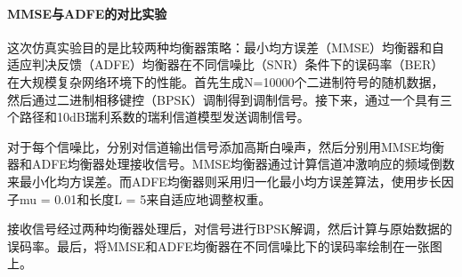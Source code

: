 \documentclass[UTF8,a4paper,12pt]{ctexart}
\numberwithin{equation}{section}
\begin{document}
\paragraph{MMSE与ADFE的对比实验}
这次仿真实验目的是比较两种均衡器策略：最小均方误差（MMSE）均衡器和自适应判决反馈（ADFE）均衡器在不同信噪比（SNR）条件下的误码率（BER）在大规模复杂网络环境下的性能。首先生成N=10000个二进制符号的随机数据，然后通过二进制相移键控（BPSK）调制得到调制信号。接下来，通过一个具有三个路径和10dB瑞利系数的瑞利信道模型发送调制信号。

对于每个信噪比，分别对信道输出信号添加高斯白噪声，然后分别用MMSE均衡器和ADFE均衡器处理接收信号。MMSE均衡器通过计算信道冲激响应的频域倒数来最小化均方误差。而ADFE均衡器则采用归一化最小均方误差算法，使用步长因子mu = 0.01和长度L = 5来自适应地调整权重。

接收信号经过两种均衡器处理后，对信号进行BPSK解调，然后计算与原始数据的误码率。最后，将MMSE和ADFE均衡器在不同信噪比下的误码率绘制在一张图上。
\end{document}
